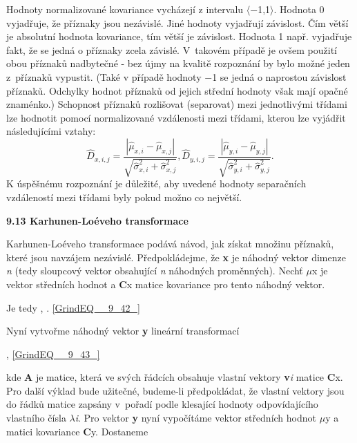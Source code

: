 Hodnoty normalizované kovariance vycházejí z intervalu $\langle$$-$1,1$\rangle$. Hodnota 0 vyjadřuje, že příznaky jsou nezávislé. Jiné hodnoty vyjadřují závislost. Čím větší je absolutní hodnota kovariance, tím větší je závislost. Hodnota 1 např. vyjadřuje fakt, že se jedná o příznaky zcela závislé. V~takovém případě je ovšem použití obou příznaků nadbytečné - bez újmy na kvalitě rozpoznání by bylo možné jeden z~příznaků vypustit. (Také v případě hodnoty $-$1 se jedná o naprostou závislost příznaků. Odchylky hodnot příznaků od jejich střední hodnoty však mají opačné znaménko.) Schopnost příznaků rozlišovat (separovat) mezi jednotlivými třídami lze hodnotit pomocí normalizované vzdálenosti mezi třídami, kterou lze vyjádřit následujícími vztahy:
\begin{equation} \label{GrindEQ__9_41_} 
\hat{D}_{x,i,j} =\frac{\left|\hat{\mu }_{x,i} -\hat{\mu }_{x,j} \right|}{\sqrt{\hat{\sigma }_{x,i}^{2} +\hat{\sigma }_{x,j}^{2} } } ,     \hat{D}_{y,i,j} =\frac{\left|\hat{\mu }_{y,i} -\hat{\mu }_{y,j} \right|}{\sqrt{\hat{\sigma }_{y,i}^{2} +\hat{\sigma }_{y,j}^{2} } } .  
\end{equation} 
K úspěšnému rozpoznání je důležité, aby uvedené hodnoty separačních vzdáleností mezi třídami byly pokud možno co největší.

\noindent \textbf{}

\noindent \textbf{9.13 Karhunen-Loéveho transformace}

\noindent Karhunen-Loéveho transformace podává návod, jak získat množinu příznaků, které jsou navzájem nezávislé.\textbf{ }Předpokládejme, že \textbf{x} je náhodný vektor dimenze \textit{n} (tedy sloupcový vektor obsahující \textit{n} náhodných proměnných). Nechť \textbf{$\mu$}x je vektor středních hodnot a \textbf{C}x matice kovariance pro tento náhodný vektor. 

\noindent Je tedy ,     . \eqref{GrindEQ__9_42_}

\noindent Nyní vytvořme náhodný vektor \textbf{y} lineární transformací

 , \eqref{GrindEQ__9_43_}

\noindent kde \textbf{A} je matice, která ve svých řádcích obsahuje vlastní vektory\textbf{ v}\textit{i} matice \textbf{C}x. Pro další výklad bude užitečné, budeme-li předpokládat, že vlastní vektory jsou do řádků matice zapsány v~pořadí podle klesající hodnoty odpovídajícího vlastního čísla $\lambda$\textit{i}. Pro vektor \textbf{y} nyní vypočítáme vektor středních hodnot \textbf{$\mu$}y a matici kovariance \textbf{C}y. Dostaneme

